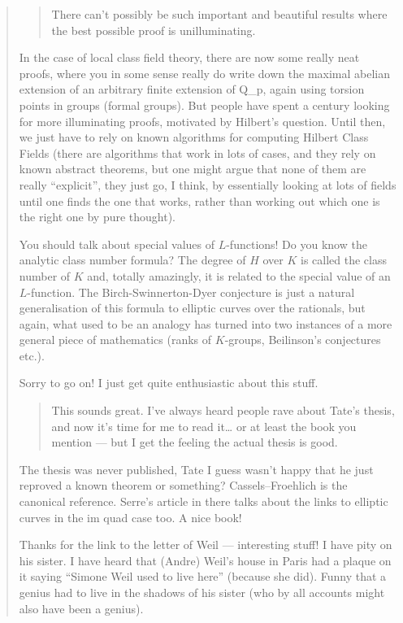 \documentclass{article}
\begin{document}
\begin{quote}
\begin{quote}
There can't possibly be such important and beautiful results where the
best possible proof is unilluminating.
\end{quote}

In the case of local class field theory, there are now some really neat
proofs, where you in some sense really do write down the maximal abelian
extension of an arbitrary finite extension of Q\_p, again using torsion
points in groups (formal groups). But people have spent a century
looking for more illuminating proofs, motivated by Hilbert's question.
Until then, we just have to rely on known algorithms for computing
Hilbert Class Fields (there are algorithms that work in lots of cases,
and they rely on known abstract theorems, but one might argue that none
of them are really ``explicit'', they just go, I think, by essentially
looking at lots of fields until one finds the one that works, rather
than working out which one is the right one by pure thought).

You should talk about special values of \(L\)-functions! Do you know the
analytic class number formula? The degree of \(H\) over \(K\) is called
the class number of \(K\) and, totally amazingly, it is related to the
special value of an \(L\)-function. The Birch-Swinnerton-Dyer conjecture
is just a natural generalisation of this formula to elliptic curves over
the rationals, but again, what used to be an analogy has turned into two
instances of a more general piece of mathematics (ranks of \(K\)-groups,
Beilinson's conjectures etc.).

Sorry to go on! I just get quite enthusiastic about this stuff.

\begin{quote}
This sounds great. I've always heard people rave about Tate's thesis,
and now it's time for me to read it\ldots{} or at least the book you
mention --- but I get the feeling the actual thesis is good.
\end{quote}

The thesis was never published, Tate I guess wasn't happy that he just
reproved a known theorem or something? Cassels--Froehlich is the
canonical reference. Serre's article in there talks about the links to
elliptic curves in the im quad case too. A nice book!

Thanks for the link to the letter of Weil --- interesting stuff! I have
pity on his sister. I have heard that (Andre) Weil's house in Paris had
a plaque on it saying ``Simone Weil used to live here'' (because she
did). Funny that a genius had to live in the shadows of his sister (who
by all accounts might also have been a genius).


\end{quote}
\end{document}
